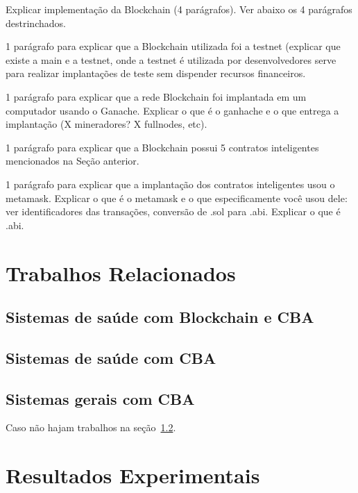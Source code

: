 \documentclass[a4paper,11pt]{article}
\begin{document}
{\color{ForestGreen} Explicar implementação da Blockchain (4 parágrafos). Ver abaixo os 4 parágrafos destrinchados. }

{\color{Magenta} 1 parágrafo para explicar que a Blockchain utilizada foi a testnet (explicar que existe a main e a testnet, onde a testnet é utilizada por desenvolvedores serve para realizar implantações de teste sem dispender recursos financeiros.}

{\color{Magenta} 1 parágrafo para explicar que a rede Blockchain foi implantada em um computador usando o Ganache. Explicar o que é o ganhache e o que entrega a implantação (X mineradores? X fullnodes, etc).}

{\color{Magenta} 1 parágrafo para explicar que a Blockchain possui 5 contratos inteligentes mencionados na Seção anterior.}

{\color{Magenta} 1 parágrafo para explicar que a implantação dos contratos inteligentes usou o metamask. Explicar o que é o metamask e o que especificamente você usou dele: ver identificadores das transações, conversão de .sol para .abi. Explicar o que é .abi.}

\newpage
\section{Trabalhos Relacionados}

\subsection{Sistemas de saúde com Blockchain e CBA}

\subsection{Sistemas de saúde com CBA}
\label{sub:sec:saude-cba}

\subsection{Sistemas gerais com CBA}

Caso não hajam trabalhos na seção~\ref{sub:sec:saude-cba}.

\newpage
\section{Resultados Experimentais}
\end{document}
